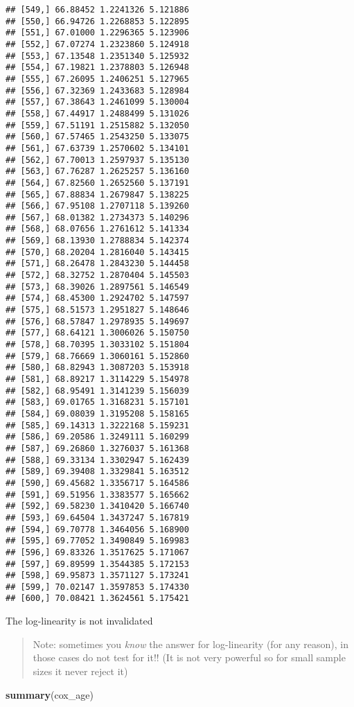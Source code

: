 \documentclass[]{book}
\newenvironment{Shaded}{\begin{snugshade}}{\end{snugshade}}
\newcommand{\KeywordTok}[1]{\textcolor[rgb]{0.13,0.29,0.53}{\textbf{{#1}}}}
\newcommand{\NormalTok}[1]{{#1}}
\theoremstyle{definition}
\theoremstyle{definition}
\theoremstyle{definition}
\theoremstyle{remark}
\begin{document}
\begin{verbatim}
## [549,] 66.88452 1.2241326 5.121886
## [550,] 66.94726 1.2268853 5.122895
## [551,] 67.01000 1.2296365 5.123906
## [552,] 67.07274 1.2323860 5.124918
## [553,] 67.13548 1.2351340 5.125932
## [554,] 67.19821 1.2378803 5.126948
## [555,] 67.26095 1.2406251 5.127965
## [556,] 67.32369 1.2433683 5.128984
## [557,] 67.38643 1.2461099 5.130004
## [558,] 67.44917 1.2488499 5.131026
## [559,] 67.51191 1.2515882 5.132050
## [560,] 67.57465 1.2543250 5.133075
## [561,] 67.63739 1.2570602 5.134101
## [562,] 67.70013 1.2597937 5.135130
## [563,] 67.76287 1.2625257 5.136160
## [564,] 67.82560 1.2652560 5.137191
## [565,] 67.88834 1.2679847 5.138225
## [566,] 67.95108 1.2707118 5.139260
## [567,] 68.01382 1.2734373 5.140296
## [568,] 68.07656 1.2761612 5.141334
## [569,] 68.13930 1.2788834 5.142374
## [570,] 68.20204 1.2816040 5.143415
## [571,] 68.26478 1.2843230 5.144458
## [572,] 68.32752 1.2870404 5.145503
## [573,] 68.39026 1.2897561 5.146549
## [574,] 68.45300 1.2924702 5.147597
## [575,] 68.51573 1.2951827 5.148646
## [576,] 68.57847 1.2978935 5.149697
## [577,] 68.64121 1.3006026 5.150750
## [578,] 68.70395 1.3033102 5.151804
## [579,] 68.76669 1.3060161 5.152860
## [580,] 68.82943 1.3087203 5.153918
## [581,] 68.89217 1.3114229 5.154978
## [582,] 68.95491 1.3141239 5.156039
## [583,] 69.01765 1.3168231 5.157101
## [584,] 69.08039 1.3195208 5.158165
## [585,] 69.14313 1.3222168 5.159231
## [586,] 69.20586 1.3249111 5.160299
## [587,] 69.26860 1.3276037 5.161368
## [588,] 69.33134 1.3302947 5.162439
## [589,] 69.39408 1.3329841 5.163512
## [590,] 69.45682 1.3356717 5.164586
## [591,] 69.51956 1.3383577 5.165662
## [592,] 69.58230 1.3410420 5.166740
## [593,] 69.64504 1.3437247 5.167819
## [594,] 69.70778 1.3464056 5.168900
## [595,] 69.77052 1.3490849 5.169983
## [596,] 69.83326 1.3517625 5.171067
## [597,] 69.89599 1.3544385 5.172153
## [598,] 69.95873 1.3571127 5.173241
## [599,] 70.02147 1.3597853 5.174330
## [600,] 70.08421 1.3624561 5.175421
\end{verbatim}

The log-linearity is not invalidated

\begin{quote}
Note: sometimes you \emph{know} the answer for log-linearity (for any
reason), in those cases do not test for it!! (It is not very powerful so
for small sample sizes it never reject it)
\end{quote}

\begin{Shaded}
\begin{Highlighting}[]
\KeywordTok{summary}\NormalTok{(cox_age)}
\end{Highlighting}
\end{Shaded}
\end{document}
